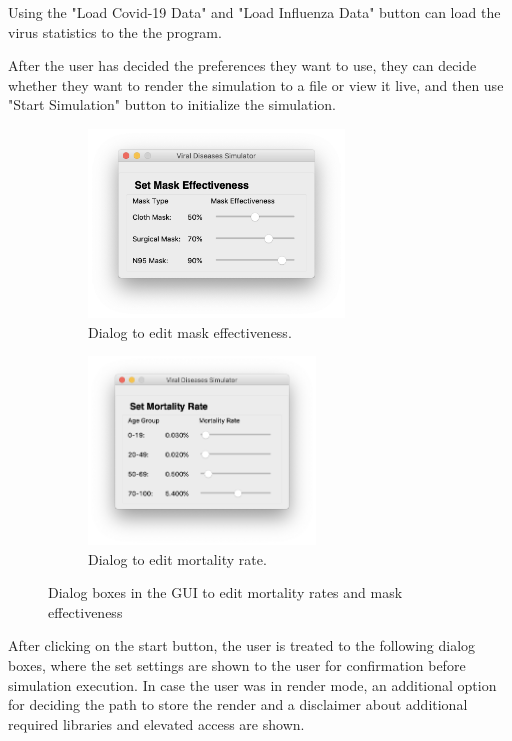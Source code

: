 \documentclass[11pt]{article}
\begin{document}
Using the "Load Covid-19 Data" and "Load Influenza Data" button can load the virus statistics to the the program. 

After the user has decided the preferences they want to use, they can decide whether they want to render the simulation to a file or view it live, and then use "Start Simulation" button to initialize the simulation.

\begin{figure}[H]
    \centering
    \begin{subfigure}[b]{0.4\textwidth}
        \includegraphics[height=5cm]{figures/GUI-mask.png}
        \caption{Dialog to edit mask effectiveness.}
    \end{subfigure}
    \begin{subfigure}[b]{0.4\textwidth}
        \includegraphics[height=5cm]{figures/GUI-mortality.png}
        \caption{Dialog to edit mortality rate.}
    \end{subfigure}
    \caption{Dialog boxes in the GUI to edit mortality rates and mask effectiveness}
\end{figure}

After clicking on the start button, the user is treated to the following dialog boxes, where the set settings are shown to the user for confirmation before simulation execution. In case the user was in render mode, an additional option for deciding the path to store the render and a disclaimer about additional required libraries and elevated access are shown.
\end{document}

